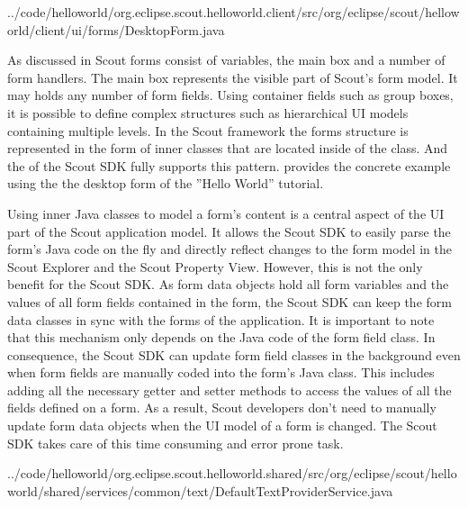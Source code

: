 \documentclass[a4paper,10pt,twoside]{book}
\begin{document}

{../code/helloworld/org.eclipse.scout.helloworld.client/src/org/eclipse/scout/helloworld/client/ui/forms/DesktopForm.java}

As discussed in  Scout forms consist of variables, the main box and a number of form handlers.
The main box represents the visible part of Scout's form model.
It may holds any number of form fields.
Using container fields such as group boxes, it is possible to define complex structures such as hierarchical UI models containing multiple levels.
In the Scout framework the forms structure is represented in the form of inner classes that are located inside of the  class.
And the  of the Scout SDK fully supports this pattern.
 provides the concrete example using the the desktop form of the ''Hello World'' tutorial.

Using inner Java classes to model a form's content is a central aspect of the UI part of the Scout application model.
It allows the Scout SDK to easily parse the form's Java code on the fly and directly reflect changes to the form model in the Scout Explorer and the Scout Property View.
However, this is not the only benefit for the Scout SDK.
As form data objects hold all form variables and the values of all form fields contained in the form, the Scout SDK can keep the form data classes in sync with the forms of the application.
It is important to note that this mechanism only depends on the Java code of the form field class.
In consequence, the Scout SDK can update form field classes in the background even when form fields are manually coded into the form's Java class.
This includes adding all the necessary getter and setter methods to access the values of all the fields defined on a form.
As a result, Scout developers don't need to manually update form data objects when the UI model of a form is changed.
The Scout SDK takes care of this time consuming and error prone task.


{../code/helloworld/org.eclipse.scout.helloworld.shared/src/org/eclipse/scout/helloworld/shared/services/common/text/DefaultTextProviderService.java}
\end{document}
